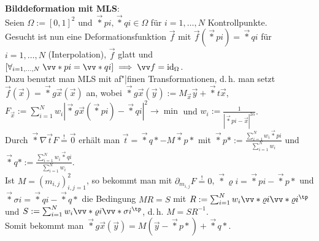 \linie

\textbf{Bilddeformation mit MLS}:\\
Seien $\Omega := [0, 1]^2$ und $\vec*{p}{i}, \vec*{q}{i} \in \Omega$
für $i = 1, \dotsc, N$ Kontrollpunkte.\\
Gesucht ist nun eine Deformationsfunktion $\vec{f}$ mit
$\vec{f}(\vec*{p}{i}) = \vec*{q}{i}$ für $i = 1, \dotsc, N$ (Interpolation),
$\vec{f}$ glatt und
$[\forall_{i=1,\dotsc,N}\; \vec*{p}{i} = \vec*{q}{i}] \implies \vec{f} = \id_\Omega$.\\
Dazu benutzt man MLS mit af"|finen Transformationen, d.\,h. man setzt
$\vec{f}(\vec{x}) = \vec*{g}{\vec{x}}(\vec{x})$ an,
wobei $\vec*{g}{\vec{x}}(\vec{y}) := M_{\vec{x}} \vec{y} + \vec*{t}{\vec{x}}$,
$F_{\vec{x}} := \sum_{i=1}^N w_i |\vec*{g}{\vec{x}}(\vec*{p}{i}) - \vec*{q}{i}|^2 \to \min$ und
$w_i := \frac{1}{|\vec*{p}{i} - \vec{x}|^{2\alpha}}$.\\
Durch $\vec*{\nabla}{\vec{t}} F \overset{!}{=} \vec{0}$
erhält man $\vec{t} = \vec*{q}{\ast} - M\vec*{p}{\ast}$ mit
$\vec*{p}{\ast} := \frac{\sum_{i=1}^N w_i\vec*{p}{i}}{\sum_{i=1}^N w_i}$ und
$\vec*{q}{\ast} := \frac{\sum_{i=1}^N w_i\vec*{q}{i}}{\sum_{i=1}^N w_i}$.\\
Ist $M = (m_{i,j})_{i,j=1}^2$, so bekommt man mit $\partial_{m_{i,j}} F \overset{!}{=} 0$,
$\vec*{\varrho}{i} = \vec*{p}{i} - \vec*{p}{\ast}$ und
$\vec*{\sigma}{i} = \vec*{q}{i} - \vec*{q}{\ast}$ die Bedingung
$MR = S$ mit
$R := \sum_{i=1}^N w_i \vec*{\varrho}{i} \vec*{\varrho}{i}^\tp$ und
$S := \sum_{i=1}^N w_i \vec*{\varrho}{i} \vec*{\sigma}{i}^\tp$,
d.\,h. $M = SR^{-1}$.\\
Somit bekommt man $\vec*{g}{\vec{x}}(\vec{y}) = M(\vec{y} - \vec*{p}{\ast}) + \vec*{q}{\ast}$.

\pagebreak
